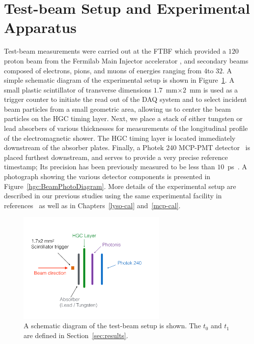 \section{Test-beam Setup and Experimental Apparatus }\label{hgc:TB}
\label{sec:tbeam}
Test-beam measurements were carried out at the FTBF which provided a $120$\GeV proton beam from the Fermilab Main Injector accelerator
, and secondary beams composed of electrons, pions, and muons of
energies ranging from $4$\GeV to $32$\GeV. A simple schematic diagram of the
experimental setup is shown in Figure~\ref{hgc:BeamSchematicDiagram}. A small
plastic scintillator of transverse dimensions $1.7$~mm$\times 2$~mm is used as a
trigger counter to initiate the read out of the DAQ system
and to select incident beam particles from a small geometric area, allowing us to center the 
beam particles on the HGC timing layer. Next, we place a stack of
either tungsten or lead absorbers of various thicknesses for
measurements of the longitudinal profile of the electromagnetic shower. The
HGC timing layer is located immediately downstream of the absorber
plates. Finally, a Photek 240 MCP-PMT detector~\cite{Anderson:2015gha,
MCPFastCaloNIMA, Ronzhin2015288,Ronzhin201552} is placed furthest downstream,
and serves to provide a very precise reference timestamp; Its
precision has been previously measured to be less than $10$~ps~\cite{Ronzhin2015288}. 
A photograph showing the various
detector components is presented in
Figure~\ref{hgc:BeamPhotoDiagram}. More
details of the experimental setup are described in our previous studies using
the same experimental facility in references~\cite{Anderson:2015gha,
MCPFastCaloNIMA, Ronzhin2015288,Ronzhin201552} as well as in Chapters~\ref{lyso-cal} and~\ref{mcp-cal}.
\begin{figure}[h] 
\centering
\includegraphics[width=0.65\textwidth]{HGC/cartoon_setup2.pdf} 
\caption{A schematic diagram of the test-beam setup is shown. The $t_0$ and $t_1$ are defined in Section~\ref{sec:results}.} 
\label{hgc:BeamSchematicDiagram} 
\end{figure} 
